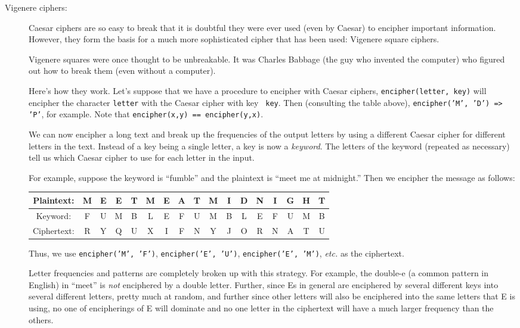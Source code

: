 \documentclass{article}
\begin{document}
\begin{description}
\item[Vigenere ciphers:]  Caesar ciphers are so easy to break that it
  is doubtful they were ever used (even by Caesar) to encipher
  important information.  However, they form the basis for a much more
  sophisticated cipher that has been used:  Vigenere square ciphers.

Vigenere squares were once thought to be unbreakable.  It was Charles
Babbage (the guy who invented the computer) who figured out how to
break them (even without a computer).

Here's how they work.  Let's suppose that we have a procedure to
encipher with Caesar ciphers, {\tt encipher(letter, key)} will
encipher the character {\tt letter} with the Caesar cipher with key {\tt
  key}.  Then (consulting the table above), {\tt encipher('M', 'D') =>
  'P'}, for example.  Note that {\tt encipher(x,y) == encipher(y,x)}.

We can now encipher a long text and break up the frequencies of the
output letters by using a different Caesar cipher for different
letters in the text.  Instead of a key being a single letter, a key is
now a {\em keyword}.  The letters of the keyword (repeated as
necessary) tell us which Caesar cipher to use for each letter in the
input.

For example, suppose the keyword is ``fumble'' and the plaintext is
``meet me at midnight.''  Then we encipher the message as
follows:

\begin{tabular}{|c|c|c|c|c|c|c|c|c|c|c|c|c|c|c|c|c|}
    \hline
  Plaintext: &  M&E&E&T&M&E&A&T&M&I&D&N&I&G&H&T  \\\hline
  Keyword: &    F&U&M&B&L&E&F&U&M&B&L&E&F&U&M&B  \\\hline
  Ciphertext: & R&Y&Q&U&X&I&F&N&Y&J&O&R&N&A&T&U  \\\hline
\end{tabular}

Thus, we use {\tt encipher('M', 'F')}, {\tt encipher('E', 'U')},
{\tt encipher('E', 'M')}, {\em etc.} as the ciphertext.

Letter frequencies and patterns are completely broken up with this
strategy.  For example, the double-e (a common pattern in English) in
``meet'' is {\em not} enciphered by a double letter.  Further, since
Es in general are enciphered by several different keys into several
different letters, pretty much at random, and further since other
letters will also be enciphered into the same letters that E is using,
no one of encipherings of E will dominate and no one letter in the
ciphertext will have a much larger frequency than the others.


\end{description}
\end{document}
